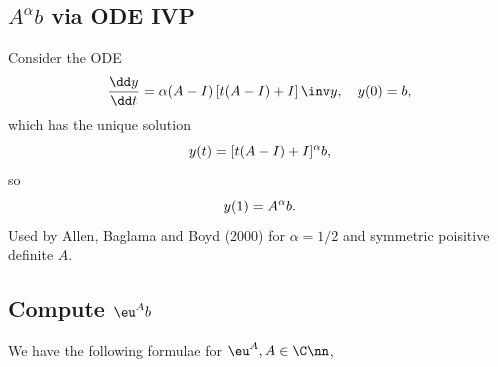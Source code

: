 \documentclass{article}
\begin{document}
\subsection{$A^{\alpha}b$ via ODE IVP}
Consider the ODE 
\begin{equation}\notag
    \frac{\dd y}{\dd t} = \alpha(A - I) \left[t(A-I)+I\right]\inv y,
    \quad y(0) = b,
\end{equation}
which has the unique solution 
\begin{equation}\notag
    y(t) = [t(A-I)+I]^{\alpha}b,
\end{equation}
so 
\begin{equation}\notag
    y(1) = A^{\alpha}b.
\end{equation}
Used by Allen, Baglama and Boyd (2000) for $\alpha = 1/2$ and
symmetric poisitive definite $A$.

\subsection{Compute $\eu^Ab$}

We have the following formulae for $\eu^A, A\in\C\nn$,
\end{document}
